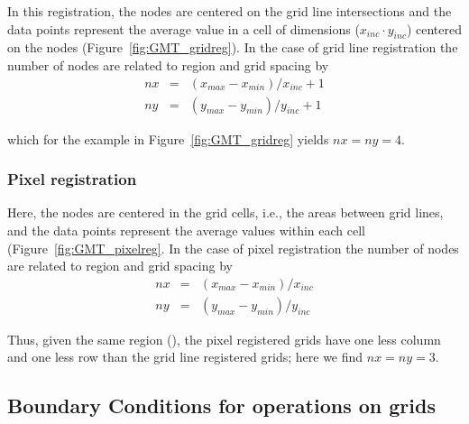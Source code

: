 In this registration, the nodes are centered on the grid line
intersections and the data points represent the average value
in a cell of dimensions ($x_{inc} \cdot y_{inc}$) centered on the
nodes (Figure~\ref{fig:GMT_gridreg}).
In the case of grid line registration the number of nodes are
related to region and grid spacing by \\

\[ \begin{array}{ccl} 
nx & =  &       (x_{max} - x_{min}) / x_{inc} + 1       \\ 
ny & =  &       (y_{max} - y_{min}) / y_{inc} + 1
\end{array} \]

which for the example in Figure~\ref{fig:GMT_gridreg} yields $nx = ny = 4$.



\subsubsection{Pixel registration}

Here, the nodes are centered in the grid cells, i.e., the areas
between grid lines, and the data points represent the average
values within each cell (Figure~\ref{fig:GMT_pixelreg}.
In the case of pixel registration the number of nodes are related
to region and grid spacing by \\

\[ \begin{array}{ccl} 
nx & =  &       (x_{max} - x_{min}) / x_{inc}   \\ 
ny & =  &       (y_{max} - y_{min}) / y_{inc}
\end{array} \]

Thus, given the same region (), the pixel registered grids have one less
column and one less row than the grid line registered grids; here we
find $nx = ny = 3$.



\subsection{Boundary Conditions for operations on grids} 


